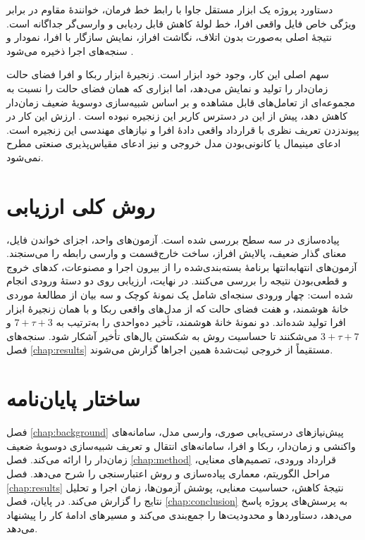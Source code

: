 دستاورد پروژه یک ابزار مستقل جاوا با رابط خط فرمان، خوانندهٔ مقاوم در برابر ویژگی خاص فایل واقعی افرا، خط لولهٔ کاهش قابل ردیابی و وارسی‌گر جداگانه است. نتیجهٔ اصلی به‌صورت  بدون اتلاف، نگاشت افراز، نمایش سازگار با افرا، نمودار و سنجه‌های اجرا ذخیره می‌شود \cite{AfraWeakTimedReduction2026}.

سهم اصلی این کار، وجود خود ابزار است. زنجیرهٔ ابزار ربکا و افرا فضای حالت زمان‌دار را تولید و نمایش می‌دهد، اما ابزاری که همان فضای حالت را نسبت به مجموعه‌ای از تعامل‌های قابل مشاهده و بر اساس شبیه‌سازی دوسویهٔ ضعیف زمان‌دار کاهش دهد، پیش از این در دسترس کاربر این زنجیره نبوده است \cite{AfraWebsite2026,AfraGitHub2026,RMCGitHub2026}. ارزش این کار در پیوندزدن تعریف نظری با قرارداد واقعی دادهٔ افرا و نیازهای مهندسی این زنجیره است. ادعای مینیمال یا کانونی‌بودن مدل خروجی و نیز ادعای مقیاس‌پذیری صنعتی مطرح نمی‌شود.

\section{روش کلی ارزیابی}

پیاده‌سازی در سه سطح بررسی شده است. آزمون‌های واحد، اجزای خواندن فایل، معنای گذار ضعیف، پالایش افراز، ساخت خارج‌قسمت و وارسی رابطه را می‌سنجند. آزمون‌های انتهابه‌انتها برنامهٔ بسته‌بندی‌شده را از بیرون اجرا و مصنوعات، کدهای خروج و قطعی‌بودن نتیجه را بررسی می‌کنند. در نهایت، ارزیابی روی دو دستهٔ ورودی انجام شده است: چهار ورودی سنجه‌ای شامل یک نمونهٔ کوچک و سه بیان از مطالعهٔ موردی خانهٔ هوشمند، و هفت فضای حالت که از مدل‌های واقعی ربکا و با همان زنجیرهٔ ابزار افرا تولید شده‌اند. دو نمونهٔ خانهٔ هوشمند، تأخیر ده‌واحدی را به‌ترتیب به $7+\tau+3$ و $3+\tau+7$ می‌شکنند تا حساسیت روش به شکستن یال‌های تأخیر آشکار شود. سنجه‌های فصل \ref{chap:results} مستقیماً از خروجی ثبت‌شدهٔ همین اجراها گزارش می‌شوند.

\section{ساختار پایان‌نامه}

فصل \ref{chap:background} پیش‌نیازهای درستی‌یابی صوری، وارسی مدل، سامانه‌های واکنشی و زمان‌دار، ربکا و افرا، سامانه‌های انتقال و تعریف شبیه‌سازی دوسویهٔ ضعیف زمان‌دار را ارائه می‌کند. فصل \ref{chap:method} قرارداد ورودی، تصمیم‌های معنایی، مراحل الگوریتم، معماری پیاده‌سازی و روش اعتبارسنجی را شرح می‌دهد. فصل \ref{chap:results} نتیجهٔ کاهش، حساسیت معنایی، پوشش آزمون‌ها، زمان اجرا و تحلیل نتایج را گزارش می‌کند. در پایان، فصل \ref{chap:conclusion} به پرسش‌های پروژه پاسخ می‌دهد، دستاوردها و محدودیت‌ها را جمع‌بندی می‌کند و مسیرهای ادامهٔ کار را پیشنهاد می‌دهد.

